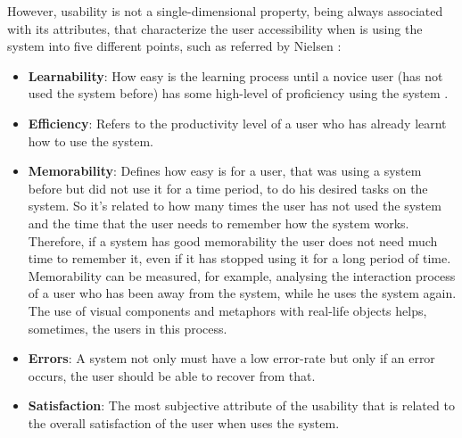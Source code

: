 However, usability is not a single-dimensional property, being always associated with its attributes, that characterize the user accessibility when is using the system into five different points, such as referred by Nielsen \cite{usabilityEngineering}:

\begin{itemize}
	\item \textbf{Learnability}: How easy is the learning process until a novice user (has not used the system before) has some high-level of proficiency using the system \cite{measuringLearnabilityInHumanComputerInteraction}. %
	\item \textbf{Efficiency}: Refers to the productivity level of a user who has already learnt how to use the system. %
	\item \textbf{Memorability}: Defines how easy is for a user, that was using a system before but did not use it for a time period, to do his desired tasks on the system. So it’s related to how many times the user has not used the system and the time that the user needs to remember how the system works. Therefore, if a system has good memorability the user does not need much time to remember it, even if it has stopped using it for a long period of time. Memorability can be measured, for example, analysing the interaction process of a user who has been away from the system, while he uses the system again. The use of visual components and metaphors with real-life objects helps, sometimes, the users in this process.
	\item \textbf{Errors}: A system not only must have a low error-rate but only if an error occurs, the user should be able to recover from that. %
	\item \textbf{Satisfaction}: The most subjective attribute of the usability that is related to the overall satisfaction of the user when uses the system. %
\end{itemize}

